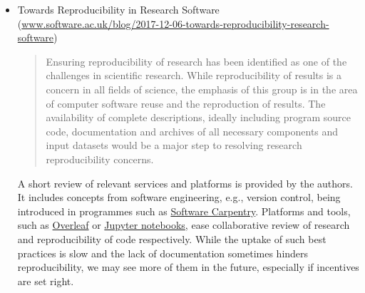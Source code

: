 \documentclass[11pt,letterpaper]{article}
\newcommand{\katznote}[1]{ {\textcolor{magenta}    { ***Dan: #1 }}}
\newcommand{\LXnote}[1]{  {\textcolor{orange}      { ***Alex: #1 }}}
\begin{document}
\begin{itemize}


\item Towards Reproducibility in Research Software\\ (\href{https://www.software.ac.uk/blog/2017-12-06-towards-reproducibility-research-software}{www.software.ac.uk/blog/2017-12-06-towards-reproducibility-research-software})
\begin{quote}
Ensuring reproducibility of research has been identified as one of the challenges in scientific research. While reproducibility of results is a concern in all fields of science, the emphasis of this group is in the area of computer software reuse and the reproduction of results. The availability of complete descriptions, ideally including program source code, documentation and archives of all necessary components and input datasets would be a major step to resolving research reproducibility concerns.
\end{quote}
A short review of relevant services and platforms is provided by the authors. It includes concepts from software engineering, e.g., version control, being introduced in programmes such as \href{https://software-carpentry.org}{Software Carpentry}.  %
Platforms and tools, such as \href{https://www.overleaf.com}{Overleaf} or \href{http://jupyter.org}{Jupyter notebooks}, ease collaborative review of research and reproducibility of code respectively. While the uptake of such best practices is slow and the lack of documentation sometimes hinders reproducibility, we may see more of them in the future, especially if incentives are set right.


\end{itemize}
\end{document}
